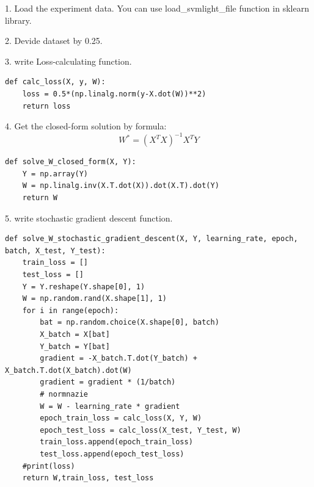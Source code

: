 \documentclass[journal, a4paper]{IEEEtran}
\begin{document}
	


1. Load the experiment data. You can use load\_svmlight\_file function in sklearn library.\par
2. Devide dataset by 0.25.\par
3. write Loss-calculating function.\par

\lstset{language=python}


\begin{lstlisting}
def calc_loss(X, y, W):
    loss = 0.5*(np.linalg.norm(y-X.dot(W))**2)
    return loss
\end{lstlisting}

4. Get the closed-form solution by formula:
$$W^* = (X^T X)^{-1} X^T Y$$\par
\begin{lstlisting}
def solve_W_closed_form(X, Y):
    Y = np.array(Y)
    W = np.linalg.inv(X.T.dot(X)).dot(X.T).dot(Y)
    return W
\end{lstlisting}

5. write stochastic gradient descent function.
\begin{lstlisting}
def solve_W_stochastic_gradient_descent(X, Y, learning_rate, epoch, batch, X_test, Y_test):
    train_loss = []
    test_loss = []
    Y = Y.reshape(Y.shape[0], 1)
    W = np.random.rand(X.shape[1], 1)
    for i in range(epoch):
        bat = np.random.choice(X.shape[0], batch)
        X_batch = X[bat]
        Y_batch = Y[bat]
        gradient = -X_batch.T.dot(Y_batch) + X_batch.T.dot(X_batch).dot(W)
        gradient = gradient * (1/batch)
        # normnazie
        W = W - learning_rate * gradient
        epoch_train_loss = calc_loss(X, Y, W)
        epoch_test_loss = calc_loss(X_test, Y_test, W)
        train_loss.append(epoch_train_loss)
        test_loss.append(epoch_test_loss)
    #print(loss)
    return W,train_loss, test_loss
\end{lstlisting}
\end{document}
